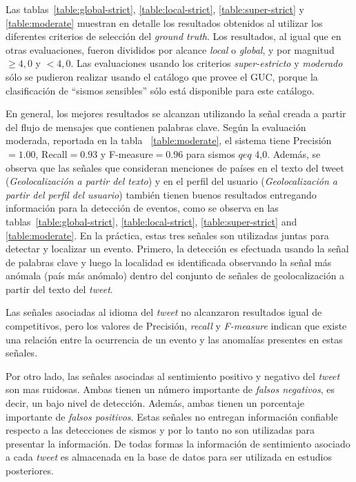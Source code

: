 Las tablas~\ref{table:global-strict}, \ref{table:local-strict}, \ref{table:super-strict} y \ref{table:moderate} muestran en detalle los resultados obtenidos al utilizar los diferentes criterios de selección del {\em ground truth}.
%
Los resultados, al igual que en otras evaluaciones, fueron divididos por alcance {\em local} o {\em global}, y por magnitud $\geq 4,0$ y $< 4,0$. Las evaluaciones usando los criterios {\em super-estricto} y {\em moderado} sólo se pudieron realizar usando el catálogo que provee el GUC, porque la clasificación de ``sismos sensibles'' sólo está disponible para este catálogo.


En general, los mejores resultados se alcanzan utilizando la señal creada a partir del flujo de mensajes que contienen palabras clave. Según la evaluación moderada, reportada en la tabla ~\ref{table:moderate}, el sistema tiene Precisión$=1.00$, Recall$=0.93$ y F-measure$=0.96$ para sismos $qeq$ 4,0. 
Además, se observa que las señales que consideran menciones de países en el texto del tweet ({\em Geolocalización a partir del texto}) y en el perfil del usuario ({\em Geolocalización a partir del perfil del usuario}) también tienen buenos resultados entregando información para la detección de eventos, como se observa en las tablas~\ref{table:global-strict}, \ref{table:local-strict}, \ref{table:super-strict} and \ref{table:moderate}.
En la práctica, estas tres señales son utilizadas juntas para detectar y localizar un evento. Primero, la detección es efectuada usando la señal de palabras clave y luego la localidad es identificada observando la señal más anómala (país más anómalo) dentro del conjunto de señales de geolocalización a partir del texto del \textit{tweet}.

Las señales asociadas al idioma del \textit{tweet} no alcanzaron resultados igual de competitivos, pero los valores de Precisión, \textit{recall} y \textit{F-measure} indican que existe una relación entre la ocurrencia de un evento y las anomalías presentes en estas señales.

Por otro lado, las señales asociadas al sentimiento positivo y negativo del \textit{tweet} son mas ruidosas. Ambas tienen un número importante de {\em falsos negativos}, es decir, un bajo nivel de detección. Además, ambas tienen un porcentaje importante de {\em falsos positivos}. Estas señales no entregan información confiable respecto a las detecciones de sismos y por lo tanto no son utilizadas para presentar la información. De todas formas la información de sentimiento asociado a cada {\em tweet} es almacenada en la base de datos para ser utilizada en estudios posteriores. 


